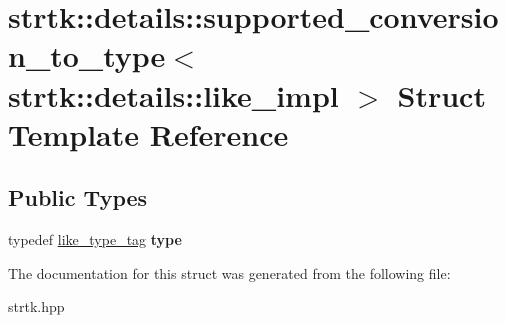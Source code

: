 \hypertarget{structstrtk_1_1details_1_1supported__conversion__to__type_3_01strtk_1_1details_1_1like__impl_01_4}{\section{strtk\-:\-:details\-:\-:supported\-\_\-conversion\-\_\-to\-\_\-type$<$ strtk\-:\-:details\-:\-:like\-\_\-impl $>$ Struct Template Reference}
\label{structstrtk_1_1details_1_1supported__conversion__to__type_3_01strtk_1_1details_1_1like__impl_01_4}
}
\subsection*{Public Types}
\begin{DoxyCompactItemize}
\item 
\hypertarget{structstrtk_1_1details_1_1supported__conversion__to__type_3_01strtk_1_1details_1_1like__impl_01_4_a7f732fd2349d1fb620970a096a4ef01c}{typedef \hyperlink{structstrtk_1_1details_1_1like__type__tag}{like\-\_\-type\-\_\-tag} {\bfseries type}}\label{structstrtk_1_1details_1_1supported__conversion__to__type_3_01strtk_1_1details_1_1like__impl_01_4_a7f732fd2349d1fb620970a096a4ef01c}

\end{DoxyCompactItemize}


The documentation for this struct was generated from the following file\-:\begin{DoxyCompactItemize}
\item 
strtk.\-hpp\end{DoxyCompactItemize}
